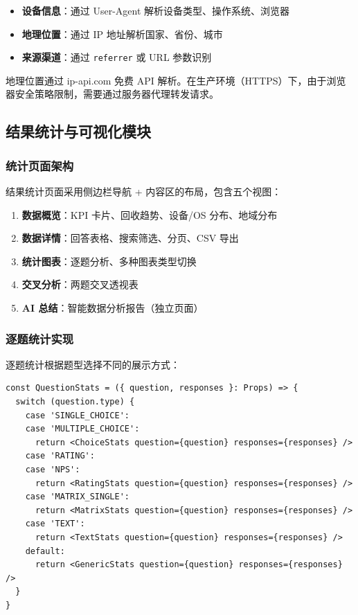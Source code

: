 \begin{itemize}
  \item \textbf{设备信息}：通过 User-Agent 解析设备类型、操作系统、浏览器
  \item \textbf{地理位置}：通过 IP 地址解析国家、省份、城市
  \item \textbf{来源渠道}：通过 \texttt{referrer} 或 URL 参数识别
\end{itemize}

地理位置通过 ip-api.com 免费 API 解析。在生产环境（HTTPS）下，由于浏览器安全策略限制，需要通过服务器代理转发请求。

\subsection{结果统计与可视化模块}

\subsubsection{统计页面架构}

结果统计页面采用侧边栏导航 + 内容区的布局，包含五个视图：

\begin{enumerate}[label=(\arabic*)]
  \item \textbf{数据概览}：KPI 卡片、回收趋势、设备/OS 分布、地域分布
  \item \textbf{数据详情}：回答表格、搜索筛选、分页、CSV 导出
  \item \textbf{统计图表}：逐题分析、多种图表类型切换
  \item \textbf{交叉分析}：两题交叉透视表
  \item \textbf{AI 总结}：智能数据分析报告（独立页面）
\end{enumerate}

\subsubsection{逐题统计实现}

逐题统计根据题型选择不同的展示方式：

\begin{verbatim}
const QuestionStats = ({ question, responses }: Props) => {
  switch (question.type) {
    case 'SINGLE_CHOICE':
    case 'MULTIPLE_CHOICE':
      return <ChoiceStats question={question} responses={responses} />
    case 'RATING':
    case 'NPS':
      return <RatingStats question={question} responses={responses} />
    case 'MATRIX_SINGLE':
      return <MatrixStats question={question} responses={responses} />
    case 'TEXT':
      return <TextStats question={question} responses={responses} />
    default:
      return <GenericStats question={question} responses={responses} />
  }
}
\end{verbatim}

